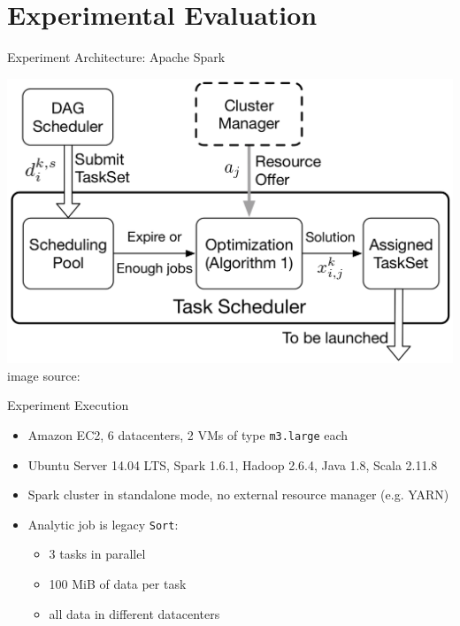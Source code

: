 \documentclass[presentation,professionalfonts]{beamer}
\begin{document}
\section{Experimental Evaluation}

\begin{frame}{Experiment Architecture: Apache Spark}
  \begin{center}
  \includegraphics[width=\textwidth]{experiment_arch}\\
  image source: \textcite{Chen2017}
  \end{center}
  \end{frame}

\begin{frame}{Experiment Execution}
  \begin{itemize}
  \item Amazon EC2, 6 datacenters, 2 VMs of type \texttt{m3.large} each
  \item Ubuntu Server 14.04 LTS, Spark 1.6.1, Hadoop 2.6.4, Java 1.8, Scala 2.11.8
  \item Spark cluster in standalone mode, no external resource manager (e.g. YARN)
  \item Analytic job is legacy \texttt{Sort}:
    \begin{itemize}
    \item 3 tasks in parallel
    \item 100 MiB of data per task
    \item all data in different datacenters
    \end{itemize}
  \end{itemize}
\end{frame}
\end{document}
